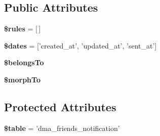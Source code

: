 \subsection*{Public Attributes}
\begin{DoxyCompactItemize}
\item 
\hypertarget{classDMA_1_1Friends_1_1Models_1_1Notification_a766ad083edbdd33b589c50997154eed2}{{\bfseries \$rules} = \mbox{[}$\,$\mbox{]}}\label{classDMA_1_1Friends_1_1Models_1_1Notification_a766ad083edbdd33b589c50997154eed2}

\item 
\hypertarget{classDMA_1_1Friends_1_1Models_1_1Notification_a5fb26a98fb9520c1444568e1c7e3515d}{{\bfseries \$dates} = \mbox{[}'created\-\_\-at', 'updated\-\_\-at', 'sent\-\_\-at'\mbox{]}}\label{classDMA_1_1Friends_1_1Models_1_1Notification_a5fb26a98fb9520c1444568e1c7e3515d}

\item 
{\bfseries \$belongs\-To}
\item 
{\bfseries \$morph\-To}
\end{DoxyCompactItemize}
\subsection*{Protected Attributes}
\begin{DoxyCompactItemize}
\item 
\hypertarget{classDMA_1_1Friends_1_1Models_1_1Notification_a4ff4d970351d372ad03efddcce990756}{{\bfseries \$table} = 'dma\-\_\-friends\-\_\-notification'}\label{classDMA_1_1Friends_1_1Models_1_1Notification_a4ff4d970351d372ad03efddcce990756}

\end{DoxyCompactItemize}


